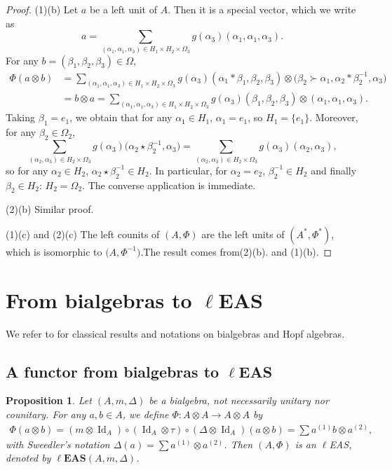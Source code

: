 \documentclass[10pt,a4paper]{amsart}
\numberwithin{equation}{section}
\newtheorem{Proposition}[Theorem]{Proposition}
 { \theoremstyle{definition}
\newtheorem{Definition}[Theorem]{Definition}
\newtheorem{Note}[Theorem]{Note}
\newtheorem{Example}[Theorem]{Example}
\newtheorem{Remark}[Theorem]{Remark}
\newtheorem{Notation}[Theorem]{Notation}}
\newcommand{\leas}{\ell\mathbf{EAS}}
\begin{document}
\begin{proof}
(1)(b) Let $a$ be a left unit of $A$. Then it is a special vector, which we write as
\[a=\sum_{(\alpha_1,\alpha_1,\alpha_3)\in H_1\times H_2\times \Omega_3}g(\alpha_3)(\alpha_1,\alpha_1,\alpha_3).\]
For any $b=(\beta_1,\beta_2,\beta_3)\in \Omega$,
\begin{align*}
\Phi(a\otimes b)&=\sum_{(\alpha_1,\alpha_1,\alpha_3)\in H_1\times H_2\times \Omega_3}g(\alpha_3)(\alpha_1*\beta_1,\beta_2,\beta_3)\otimes \bigl(\beta_2\succ \alpha_1,\alpha_2*\beta_2^{-1},\alpha_3\bigr)\\
&=b\otimes a=\sum_{(\alpha_1,\alpha_1,\alpha_3)\in H_1\times H_2\times \Omega_3}g(\alpha_3)(\beta_1,\beta_2,\beta_3)\otimes (\alpha_1,\alpha_1,\alpha_3).
\end{align*}
Taking $\beta_1=e_1$, we obtain that for any $\alpha_1\in H_1$, $\alpha_1=e_1$, so $H_1=\{e_1\}$. Moreover, for any $\beta_2\in \Omega_2$,
\[\sum_{(\alpha_2,\alpha_3)\in H_2\times \Omega_3}g(\alpha_3)\bigl(\alpha_2\star \beta_2^{-1},\alpha_3\bigr)=\sum_{(\alpha_2,\alpha_3)\in H_2\times \Omega_3}g(\alpha_3)(\alpha_2,\alpha_3),\]
so for any $\alpha_2\in H_2$, $\alpha_2\star \beta_2^{-1}\in H_2$. In particular, for $\alpha_2=e_2$, $\beta_2^{-1}\in H_2$ and finally $\beta_2\in H_2$: $H_2=\Omega_2$. The converse application is immediate.

(2)(b) Similar proof.

(1)(c) and (2)(c) The left counits of $(A,\Phi)$ are the left units of $(A^*,\Phi^*)$, which is isomorphic to $\bigl(A,\Phi^{-1}\bigr)$.The result comes from(2)(b). and (1)(b). \end{proof}


\section[From bialgebras to lEAS]{From bialgebras to $\boldsymbol{\ell}$EAS}

We refer to \cite{Abe1980,Cartier2021,Sweedler1969} for classical results and notations on bialgebras and Hopf algebras.

\subsection[A functor from bialgebras to lEAS]{A functor from bialgebras to $\boldsymbol{\ell}$EAS}

\begin{Proposition} \label{prop5.1}
Let $(A,m,\Delta)$ be a bialgebra, not necessarily unitary nor counitary. For any $a,b\in A$, we define $\Phi\colon A\otimes A\longrightarrow A\otimes A$ by
\begin{align*}
\Phi(a\otimes b) =(m\otimes \operatorname{Id}_A)\circ (\operatorname{Id}_A\otimes \tau)\circ (\Delta\otimes \operatorname{Id}_A)(a\otimes b)=\sum a^{(1)}b\otimes a^{(2)},
\end{align*}
with Sweedler's notation $\Delta(a)=\sum a^{(1)}\otimes a^{(2)}$. Then $(A,\Phi)$ is an $\ell$EAS, denoted by $\leas(A,\allowbreak m,\Delta)$.
\end{Proposition}
\end{document}
